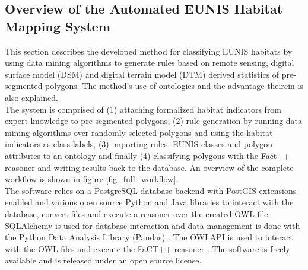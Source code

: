 \documentclass[authoryear, review,12pt,number]{elsarticle}
\begin{document}
\subsection{Overview of the Automated EUNIS Habitat Mapping System}
This section describes the developed method for classifying EUNIS habitats by
using data mining algorithms to generate rules based on remote sensing, digital
surface model (DSM) and digital terrain model (DTM) derived statistics of
pre-segmented polygons. The method's use of ontologies and the advantage
theirein is also explained.\\
The system is comprised of (1) attaching
formalized habitat indicators from expert knowledge to pre-segmented polygons,
(2) rule generation by running data mining algorithms over randomly selected
polygons and using the habitat indicators as class labels, (3) importing rules,
EUNIS classes and polygon attributes to an ontology and finally (4) classifying
polygons with the Fact++ reasoner \citep{Tsarkov2006} and writing results back
to the database. An overview of the complete workflow is shown in figure
\ref{fig_full_workflow}.\\
The software relies on a PostgreSQL database backend with PostGIS extensions
enabled and various open source Python and Java libraries to interact with the
database, convert files and execute a reasoner over the created OWL file.
SQLAlchemy is used for database interaction and data management is done with
the Python Data Analysis Library (Pandas) \citep{McKinney2010}. The OWLAPI is
used to interact with the OWL files and execute the FaCT++ reasoner
\citep{Tsarkov2006}. The software is freely available and is released under an
open source license.  
\end{document}
